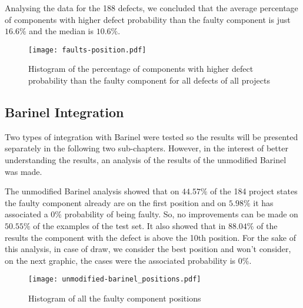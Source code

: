 Analysing the data for the 188 defects, we concluded that the average percentage of components with higher defect probability than the faulty component is just $16.6\%$ and the median is $10.6\%$.
%
\begin{figure}[H]
  \begin{center}
    \leavevmode
    \texttt{[image: faults-position.pdf]}
    \caption{Histogram of the percentage of components with higher defect probability than the faulty component for all defects of all projects}
    \label{fig:dp-faults-position}
  \end{center}
\end{figure}



\subsection{Barinel Integration}


Two types of integration with Barinel were tested so the results will be presented separately in the following two sub-chapters. However, in the interest of better understanding the results, an analysis of the results of the unmodified Barinel was made.

The unmodified Barinel analysis showed that on $44.57\%$ of the 184 project states the faulty component already are on the first position and on $5.98\%$ it has associated a $0\%$ probability of being faulty. So, no improvements can be made on $50.55\%$ of the examples of the test set. It also showed that in $88.04\%$ of the results the component with the defect is above the 10th position. For the sake of this analysis, in case of draw, we consider the best position and won't consider, on the next graphic, the cases were the associated probability is $0\%$.
%
\begin{figure}[H]
  \begin{center}
    \leavevmode
    \texttt{[image: unmodified-barinel\_positions.pdf]}
    \caption{Histogram of all the faulty component positions}
    \label{fig:fault-positions}
  \end{center}
\end{figure}



